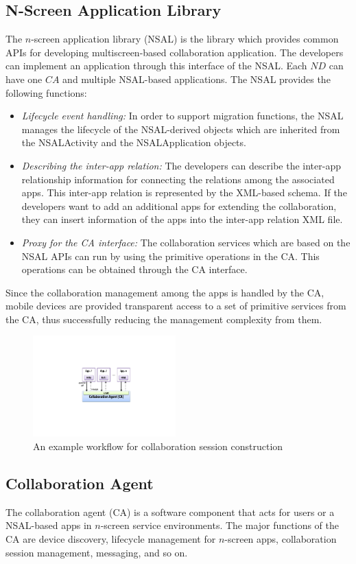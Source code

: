 \documentclass{sig-alternate}
\newcommand{\bi}{\begin{itemize}}
\newcommand{\ei}{\end{itemize}}
\newcommand{\ii}{\item}
\begin{document}
\subsection{N-Screen Application Library}
The $n$-screen application library (NSAL) is the library which provides common APIs for developing multiscreen-based collaboration application. The developers can implement an application through this interface of the NSAL. Each $ND$ can have one $CA$ and multiple NSAL-based applications. The NSAL provides the following functions:
\bi
\ii \textit{Lifecycle event handling: } In order to support migration functions, the NSAL manages the lifecycle of the NSAL-derived objects which are inherited from the NSALActivity and the NSALApplication objects. 
\ii \textit{Describing the inter-app relation:} The developers can describe the inter-app relationship information for connecting the relations among the associated apps. This inter-app relation is represented by the XML-based schema. If the developers want to add an additional apps for extending the collaboration, they can insert information of the apps into the inter-app relation XML file.
\ii \textit{Proxy for the CA interface: } The collaboration services which are based on the NSAL APIs can run by using the primitive operations in the CA. This operations can be obtained through the CA interface. 
\ei 
Since the collaboration management among the apps is handled by the CA, 
mobile devices are provided transparent access to a set of primitive services from the CA, thus successfully reducing the management complexity from them.
    \begin{figure}[htb] %
    \centering
    \includegraphics[width=5.5cm,keepaspectratio]{ca-api}
    \caption{An example workflow for collaboration session construction}
    \label{fig:ca-api}
    \end{figure}

\subsection{Collaboration Agent}
The collaboration agent (CA) is a software component that acts for users or a NSAL-based apps in $n$-screen service environments.  The major functions of the CA are device discovery, lifecycle management for $n$-screen apps, collaboration session management, messaging, and so on. \\
\end{document}
